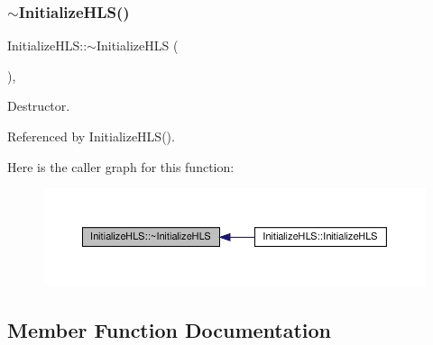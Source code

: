 \subsubsection{\texorpdfstring{$\sim$\+Initialize\+H\+L\+S()}{~InitializeHLS()}}
{\footnotesize\ttfamily Initialize\+H\+L\+S\+::$\sim$\+Initialize\+H\+LS (\begin{DoxyParamCaption}{ }\end{DoxyParamCaption})\hspace{0.3cm}{\ttfamily [override]}, {\ttfamily [default]}}



Destructor. 



Referenced by Initialize\+H\+L\+S().

Here is the caller graph for this function\+:
\nopagebreak
\begin{figure}[H]
\begin{center}
\leavevmode
\includegraphics[width=350pt]{d1/dad/classInitializeHLS_aa77f47b5204b0a974ef83ab5bec545f8_icgraph}
\end{center}
\end{figure}


\subsection{Member Function Documentation}
\mbox{\label{classInitializeHLS_a2804a23ba47f9c42d9474cec67d6a673}} 
